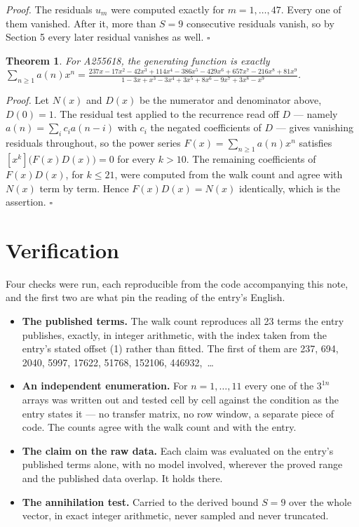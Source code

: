 \documentclass[11pt]{article}
\newtheorem{theorem}{Theorem}
\theoremstyle{definition}
\begin{document}
{\itshape Proof.} The residuals $u_m$ were computed exactly for $m = 1,\dots,47$. Every one of them vanished. After it, more than $S = 9$ consecutive residuals vanish, so by Section 5 every later residual vanishes as well. $\square$

\begin{theorem} For A255618, the generating function is exactly $\sum_{n\ge 1} a(n)x^n = \frac{237x - 17x^{2} - 42x^{3} + 114x^{4} - 386x^{5} - 429x^{6} + 657x^{7} - 216x^{8} + 81x^{9}}{1 - 3x + x^{3} - 3x^{4} + 3x^{5} + 8x^{6} - 9x^{7} + 3x^{8} - x^{9}}$.\end{theorem}

{\itshape Proof.} Let $N(x)$ and $D(x)$ be the numerator and denominator above, $D(0)=1$. The residual test applied to the recurrence read off $D$ --- namely $a(n) = \sum_i c_i a(n-i)$ with $c_i$ the negated coefficients of $D$ --- gives vanishing residuals throughout, so the power series $F(x)=\sum_{n\ge 1}a(n)x^n$ satisfies $[x^k]\bigl(F(x)D(x)\bigr) = 0$ for every $k > 10$. The remaining coefficients of $F(x)D(x)$, for $k \le 21$, were computed from the walk count and agree with $N(x)$ term by term. Hence $F(x)D(x) = N(x)$ identically, which is the assertion. $\square$

\section{Verification}

Four checks were run, each reproducible from the code accompanying this note, and the first two are what pin the reading of the entry's English.

\begin{itemize}

\item {\bfseries The published terms.} The walk count reproduces all 23 terms the entry publishes, exactly, in integer arithmetic, with the index taken from the entry's stated offset (1) rather than fitted. The first of them are 237, 694, 2040, 5997, 17622, 51768, 152106, 446932,~\dots

\item {\bfseries An independent enumeration.} For $n = 1,\dots,11$ every one of the $3^{1n}$ arrays was written out and tested cell by cell against the condition as the entry states it --- no transfer matrix, no row window, a separate piece of code. The counts agree with the walk count and with the entry.

\item {\bfseries The claim on the raw data.} Each claim was evaluated on the entry's published terms alone, with no model involved, wherever the proved range and the published data overlap. It holds there.

\item {\bfseries The annihilation test.} Carried to the derived bound $S = 9$ over the whole vector, in exact integer arithmetic, never sampled and never truncated.

\end{itemize}
\end{document}
